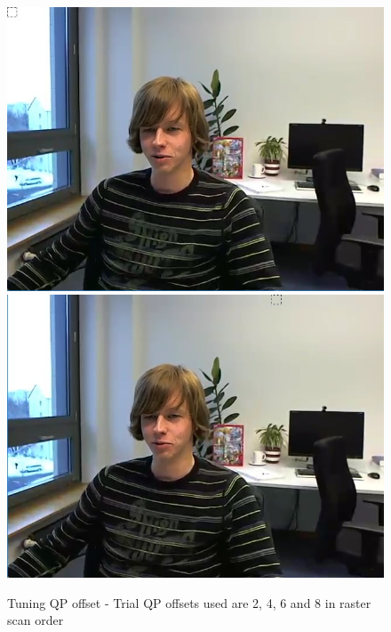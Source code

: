 \documentclass[11pt]{article} %
\begin{document}
\begin{figure}[!h]
    \includegraphics[scale=0.43]{QPOffset/trialOffset/Paul250kbps_offset6}
    \includegraphics[scale=0.43]{QPOffset/trialOffset/Paul250kbps_offset8}  
    \caption{Tuning QP offset - Trial QP offsets used are 2, 4, 6 and 8 in raster scan order}
    \label{fig:Default_QPOffsetTuning}
\end{figure}
\end{document}

